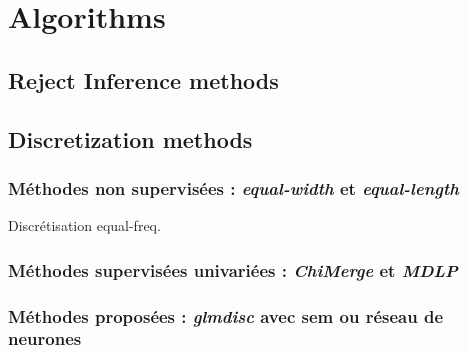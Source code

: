 \chapter{Algorithms}


\section{Reject Inference methods}


\section{Discretization methods}

\subsection{Méthodes non supervisées : \textit{equal-width} et \textit{equal-length}}


\begin{algorithm}[H]
 \caption{\label{equal-freq-disc} Discrétisation equal-freq.}
\end{algorithm}




\subsection{Méthodes supervisées univariées : \textit{ChiMerge} et \textit{MDLP}}


\subsection{Méthodes proposées : \textit{glmdisc} avec \gls{sem} ou réseau de neurones}

